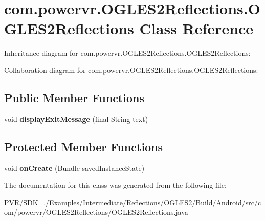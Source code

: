 \hypertarget{classcom_1_1powervr_1_1_o_g_l_e_s2_reflections_1_1_o_g_l_e_s2_reflections}{\section{com.\+powervr.\+O\+G\+L\+E\+S2\+Reflections.\+O\+G\+L\+E\+S2\+Reflections Class Reference}
\label{classcom_1_1powervr_1_1_o_g_l_e_s2_reflections_1_1_o_g_l_e_s2_reflections}
}


Inheritance diagram for com.\+powervr.\+O\+G\+L\+E\+S2\+Reflections.\+O\+G\+L\+E\+S2\+Reflections\+:


Collaboration diagram for com.\+powervr.\+O\+G\+L\+E\+S2\+Reflections.\+O\+G\+L\+E\+S2\+Reflections\+:
\subsection*{Public Member Functions}
\begin{DoxyCompactItemize}
\item 
\hypertarget{classcom_1_1powervr_1_1_o_g_l_e_s2_reflections_1_1_o_g_l_e_s2_reflections_a2eae1d6f1bde47f5350d5ec932a20727}{void {\bfseries display\+Exit\+Message} (final String text)}\label{classcom_1_1powervr_1_1_o_g_l_e_s2_reflections_1_1_o_g_l_e_s2_reflections_a2eae1d6f1bde47f5350d5ec932a20727}

\end{DoxyCompactItemize}
\subsection*{Protected Member Functions}
\begin{DoxyCompactItemize}
\item 
\hypertarget{classcom_1_1powervr_1_1_o_g_l_e_s2_reflections_1_1_o_g_l_e_s2_reflections_a133e0c466095848a91853bad9449bcb4}{void {\bfseries on\+Create} (Bundle saved\+Instance\+State)}\label{classcom_1_1powervr_1_1_o_g_l_e_s2_reflections_1_1_o_g_l_e_s2_reflections_a133e0c466095848a91853bad9449bcb4}

\end{DoxyCompactItemize}


The documentation for this class was generated from the following file\+:\begin{DoxyCompactItemize}
\item 
P\+V\+R/\+S\+D\+K\+\_./\+Examples/\+Intermediate/\+Reflections/\+O\+G\+L\+E\+S2/\+Build/\+Android/src/com/powervr/\+O\+G\+L\+E\+S2\+Reflections/O\+G\+L\+E\+S2\+Reflections.\+java\end{DoxyCompactItemize}
